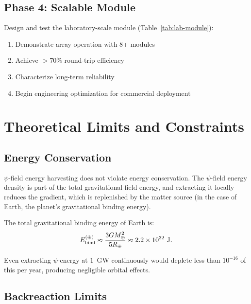 \documentclass[aps,prd,twocolumn,showpacs,preprintnumbers,superscriptaddress,nofootinbib]{revtex4-2}
\begin{document}
\subsection{Phase 4: Scalable Module}\label{sec:phase4}

Design and test the laboratory-scale module (Table~\ref{tab:lab-module}):
\begin{enumerate}
\item Demonstrate array operation with 8+ modules
\item Achieve $> 70\%$ round-trip efficiency
\item Characterize long-term reliability
\item Begin engineering optimization for commercial deployment
\end{enumerate}

\section{Theoretical Limits and Constraints}\label{sec:limits}

\subsection{Energy Conservation}\label{sec:conservation}

$\psi$-field energy harvesting does not violate energy conservation.
The $\psi$-field energy density is part of the total gravitational
field energy, and extracting it locally reduces the gradient, which is
replenished by the matter source (in the case of Earth, the planet's
gravitational binding energy).

The total gravitational binding energy of Earth is:
\begin{equation}
E_{\rm bind}^{(\oplus)} \approx \frac{3GM_\oplus^2}{5R_\oplus} \approx 2.2\times 10^{32}~\text{J}.
\end{equation}

Even extracting $\psi$-energy at $1$~GW continuously would deplete less
than $10^{-16}$ of this per year, producing negligible orbital effects.

\subsection{Backreaction Limits}\label{sec:backreaction}
\end{document}
